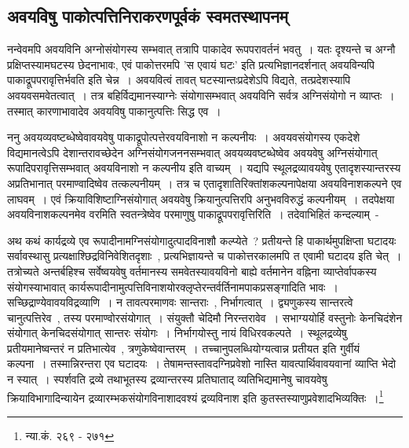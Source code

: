		\subsection{अवयविषु पाकोत्पत्तिनिराकरणपूर्वकं स्वमतस्थापनम्}

		नन्वेवमपि अवयविनि अग्नोसंयोगस्य सम्भवात् तत्रापि पाकादेव रूपपरावर्तनं भवतु~। यतः दृश्यन्ते च अग्नौ प्रक्षिप्तस्यामघटस्य छेदनाभावः, एवं पाकोत्तरमपि 'स एवायं घटः' इति प्रत्यभिज्ञानदर्शनात् अवयविन्यपि पाकाद्रूपपरावृत्तिर्भवति इति चेन्न~। अवयवित्वं तावत् घटस्यान्तःप्रदेशेऽपि विद्यते, तत्प्रदेशस्यापि अवयवसमवेतत्वात्~। तत्र बहिर्विद्यमानस्याग्नेः संयोगासम्भवात् अवयविनि सर्वत्र अग्निसंयोगो न व्याप्तः~। तस्मात् कारणाभावादेव अवयविषु पाकानुत्पत्तिः सिद्ध एव~। 

		ननु अवयव्यवष्टब्धेष्वेवावयवेषु पाकाद्रूपोत्पत्तेरवयविनाशो न कल्पनीयः~। अवयवसंयोगस्य एकदेशे विद्यमानत्वेऽपि देशान्तरावच्छेदेन अग्निसंयोगजननसम्भवात् अवयव्यवष्टब्धेष्वेव अवयवेषु अग्निसंयोगात् रूपादिपरावृत्तिसम्भवात् अवयविनाशो न कल्पनीय इति वाच्यम्~। यद्यपि स्थूलद्रव्यावयवेषु एतादृशस्यान्तरस्य अप्रतिभानात् परमाण्वादिष्वेव तत्कल्पनीयम्~। तत्र च एतादृशातिरिक्तांशकल्पनापेक्षया अवयविनाशकल्पने एव लाघवम्~। एवं क्रियाविशिष्टाग्निसंयोगात् अवयवेषु क्रियानुत्पत्तिरपि अनुभवविरुद्धं कल्पनीयम्~। तदपेक्षया अवयविनाशकल्पनमेव वरमिति स्वतन्त्रेष्वेव परमाणुषु पाकाद्रूपपरावृत्तिरिति~। तदेवाभिहितं कन्दल्याम्~-

		{\fontsize{11.7}{0}\selectfont\s अथ कथं कार्यद्रव्ये एव रूपादीनामग्निसंयोगादुत्पादविनाशौ कल्प्येते~? प्रतीयन्ते हि पाकार्थमुपक्षिप्ता घटादयः सर्वावस्थासु प्रत्यक्षाश्छिद्रविनिवेशितदृशाः~, प्रत्यभिज्ञायन्ते च पाकोत्तरकालमपि त एवामी घटादय इति चेत्~। तत्रोच्यते अन्तर्बहिश्च सर्वेष्वयवेषु वर्तमानस्य समवेतस्यावयविनो बाह्ये वर्तमानेन  वह्निना व्याप्तेर्वापकस्य संयोगस्याभावात् कार्यरूपादीनामुत्पत्तिविनाशयोरक्लृप्तेरन्तर्वर्तिनामपाकप्रसङ्गादिति भावः~। सच्छिद्राण्येवावयविद्रव्याणि~। न तावत्परमाणवः सान्तराः~, निर्भागत्वात्~। द्व्यणुकस्य सान्तरत्वे चानुत्पत्तिरेव~, तस्य परमाण्वोरसंयोगात्~। संयुक्तौ चेदिमौ निरन्तरावेव~। सभाग्ययोर्हि वस्तुनोः केनचिदंशेन संयोगात् केनचिदसंयोगात् सान्तरः संयोगः~। निर्भागयोस्तु नायं विधिरवकल्पते~। स्थूलद्रव्येषु प्रतीयमानेष्वन्तरं न प्रतिभात्येव~, त्रणुकेष्वेवान्तरम्~। तच्चानुपलब्धियोग्यत्वान्न प्रतीयत इति गुर्वीयं कल्पना~। तस्मान्निरन्तरा एव घटादयः~। तेषामन्तस्तावदग्निप्रवेशो नास्ति यावत्पार्थिवावयवानां व्याप्ति भेदो न स्यात्~। स्पर्शवति द्रव्ये तथाभूतस्य द्रव्यान्तरस्य प्रतिघाताद् व्यतिभिद्यमानेषु चावयवेषु क्रियाविभागादिन्यायेन द्रव्यारम्भकसंयोगविनाशादवश्यं द्रव्यविनाश इति कुतस्तस्याणुप्रवेशादभिव्यक्तिः~।\footnote{न्या.कं. २६९ - २७१}}

